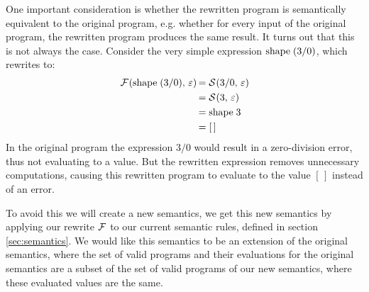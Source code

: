 \documentclass[../main.tex]{subfiles}
\begin{document}
One important consideration is whether the rewritten program is semantically equivalent to the original program, e.g. whether for every input of the original program, the rewritten program produces the same result. It turns out that this is not always the case. Consider the very simple expression $\text{shape}\; (3 / 0)$, which rewrites to:
\begin{align*}
    \mathcal{F}\hspace{-1.2pt} \left( \text{shape}\; (3 / 0),\, \varepsilon \right) \hspace{-1pt}
        &= \mathcal{S}\hspace{-1.2pt} \left( 3 / 0,\, \varepsilon \right) \hspace{-1pt} \\
        &= \mathcal{S}\hspace{-1.2pt} \left( 3,\, \varepsilon \right) \hspace{-1pt} \\
        &= \text{shape}\; 3 \\
        &= [\,]
\end{align*}
%
In the original program the expression $3 / 0$ would result in a zero-division error, thus not evaluating to a value. But the rewritten expression removes unnecessary computations, causing this rewritten program to evaluate to the value $[\,]$ instead of an error.

To avoid this we will create a new semantics, we get this new semantics by applying our rewrite $\mathcal{F}$ to our current semantic rules, defined in section \ref{sec:semantics}. We would like this semantics to be an extension of the original semantics, where the set of valid programs and their evaluations for the original semantics are a subset of the set of valid programs of our new semantics, where these evaluated values are the same.
\end{document}
